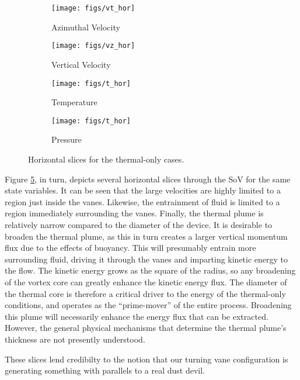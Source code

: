 \begin{figure}[htb]

 \begin{subfigure}{.5\textwidth}
  \centering
  \texttt{[image: figs/vt\_hor]}
  \caption{Azimuthal Velocity}
  \label{fig:vt-to}
 \end{subfigure}%
 \begin{subfigure}{.5\textwidth}
  \centering
  \texttt{[image: figs/vz\_hor]}
  \caption{Vertical Velocity}
  \label{fig:vz-to}
 \end{subfigure}%


 \begin{subfigure}{.5\textwidth}
  \centering
  \texttt{[image: figs/t\_hor]}
  \caption{Temperature}
  \label{fig:t-to}
 \end{subfigure}%
 \begin{subfigure}{.5\textwidth}
  \centering
  \texttt{[image: figs/t\_hor]}
  \caption{Pressure}
  \label{fig:p-to}
 \end{subfigure}%

 \caption{Horizontal slices for the thermal-only cases.}
 \label{fig:to-hor}
\end{figure}

Figure \ref{fig:to-hor}, in turn,  depicts several horizontal slices
through the SoV for the same state variables. It can be seen that the
large velocities are highly limited to a region just inside the
vanes. Likewise, the entrainment of fluid is limited to a region
immediately surrounding the vanes. 
%
%
Finally, the thermal plume is relatively
narrow compared to the diameter of the device. It is desirable to
broaden the thermal plume, as this in turn creates a larger vertical
momentum flux due to the effects of buoyancy. This will presumably
entrain more surrounding fluid, driving it through the vanes and
imparting kinetic energy to the flow. The kinetic energy grows as the
square of the radius, so any broadening of the vortex core can greatly
enhance the kinetic energy flux. The diameter of the thermal core is
therefore a critical driver to the energy of the thermal-only
conditions, and operates as the ``prime-mover'' of the entire
process. Broadening this plume will necessarily enhance the energy
flux that can be extracted. However, the general physical
mechanisms that determine the thermal plume's thickness are not
presently understood. 


These slices lend credibilty to the notion that our turning vane
configuration is generating something with parallels to a real dust
devil.   


